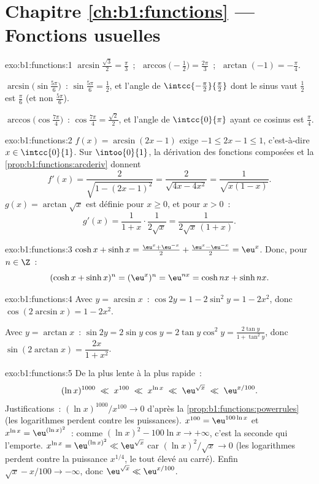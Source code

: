 \section*{Chapitre \ref{ch:b1:functions} --- Fonctions usuelles}

\begin{solution}{exo:b1:functions:1}
$\arcsin\frac{\sqrt 3}{2} = \frac\pi3$~;
$\;\arccos\bigl(-\frac12\bigr) = \frac{2\pi}{3}$~;
$\;\arctan(-1) = -\frac\pi4$.

$\arcsin\bigl(\sin\frac{5\pi}{6}\bigr)$~: $\sin\frac{5\pi}{6} =
\frac12$, et l'angle de $\intcc{-\frac\pi2}{\frac\pi2}$ dont le sinus
vaut $\frac12$ est $\frac\pi6$ (et non $\frac{5\pi}{6}$).

$\arccos\bigl(\cos\frac{7\pi}{4}\bigr)$~: $\cos\frac{7\pi}{4} =
\frac{\sqrt 2}{2}$, et l'angle de $\intcc{0}{\pi}$ ayant ce cosinus
est $\frac\pi4$.
\end{solution}

\begin{solution}{exo:b1:functions:2}
$f(x) = \arcsin(2x - 1)$ exige $-1 \leq 2x - 1 \leq 1$, c'est-à-dire
$x \in \intcc{0}{1}$. Sur $\intoo{0}{1}$, la dérivation des fonctions
composées et la \cref{prop:b1:functions:arcderiv} donnent
\[
f'(x) = \frac{2}{\sqrt{1 - (2x-1)^2}} = \frac{2}{\sqrt{4x - 4x^2}}
= \frac{1}{\sqrt{x(1 - x)}} .
\]
$g(x) = \arctan\sqrt x$ est définie pour $x \geq 0$, et pour $x > 0$~:
\[
g'(x) = \frac{1}{1 + x} \cdot \frac{1}{2\sqrt x}
= \frac{1}{2\sqrt x\,(1 + x)} .
\]
\end{solution}

\begin{solution}{exo:b1:functions:3}
$\cosh x + \sinh x = \frac{\eu^x + \eu^{-x}}{2} + \frac{\eu^x -
\eu^{-x}}{2} = \eu^x$. Donc, pour $n \in \Z$~:
\[
(\cosh x + \sinh x)^n = (\eu^x)^n = \eu^{nx}
= \cosh nx + \sinh nx .
\]
\end{solution}

\begin{solution}{exo:b1:functions:4}
Avec $y = \arcsin x$~: $\cos 2y = 1 - 2\sin^2 y = 1 - 2x^2$, donc
$\cos(2\arcsin x) = 1 - 2x^2$.

Avec $y = \arctan x$~: $\sin 2y = 2 \sin y \cos y = 2 \tan y \cos^2 y
= \frac{2\tan y}{1 + \tan^2 y}$, donc $\sin(2\arctan x) =
\dfrac{2x}{1 + x^2}$.
\end{solution}

\begin{solution}{exo:b1:functions:5}
De la plus lente à la plus rapide~:
\[
(\ln x)^{1000} \;\ll\; x^{100} \;\ll\; x^{\ln x} \;\ll\;
\eu^{\sqrt x} \;\ll\; \eu^{x/100} .
\]
Justifications~: $(\ln x)^{1000}/x^{100} \to 0$ d'après la
\cref{prop:b1:functions:powerrules} (les logarithmes perdent contre
les puissances). $x^{100} = \eu^{100\ln x}$ et $x^{\ln x} =
\eu^{(\ln x)^2}$~: comme $(\ln x)^2 - 100\ln x \to +\infty$, c'est la
seconde qui l'emporte. $x^{\ln x} = \eu^{(\ln x)^2} \ll \eu^{\sqrt x}$
car $(\ln x)^2/\sqrt x \to 0$ (les logarithmes perdent contre la
puissance $x^{1/4}$, le tout élevé au carré). Enfin $\sqrt x - x/100
\to -\infty$, donc $\eu^{\sqrt x} \ll \eu^{x/100}$.
\end{solution}

